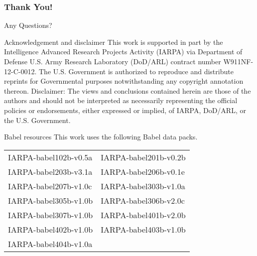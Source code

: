 \documentclass[12pt,xcolor=dvipsnames]{beamer}
\begin{document}
\begin{frame}
  \frametitle{Thank You!}
  \begin{center}
    {\color{Maroon}\Huge Any Questions?}
  \end{center}
\end{frame}


\begin{frame}{Acknowledgement and disclaimer}{}
  This work is supported in part by the Intelligence Advanced Research
  Projects Activity (IARPA) via Department of Defense U.S. Army
  Research Laboratory (DoD/ARL) contract number W911NF-12-C-0012. The
  U.S. Government is authorized to reproduce and distribute reprints
  for Governmental purposes notwithstanding any copyright annotation
  thereon.
  \vfill
  Disclaimer: The views and conclusions contained herein are
  those of the authors and should not be interpreted as necessarily
  representing the official policies or endorsements, either expressed
  or implied, of IARPA, DoD/ARL, or the U.S. Government.
\end{frame}

\begin{frame}{Babel resources}{}
  This work uses the following Babel data packs.
  \vfill
  \centering
  \begin{tabular}{@{}ll@{}}
    IARPA-babel102b-v0.5a & IARPA-babel201b-v0.2b \\
    IARPA-babel203b-v3.1a & IARPA-babel206b-v0.1e \\
    IARPA-babel207b-v1.0c & IARPA-babel303b-v1.0a \\
    IARPA-babel305b-v1.0b & IARPA-babel306b-v2.0c \\
    IARPA-babel307b-v1.0b & IARPA-babel401b-v2.0b \\
    IARPA-babel402b-v1.0b & IARPA-babel403b-v1.0b \\
    IARPA-babel404b-v1.0a & \\
  \end{tabular}
\end{frame}


\end{document}
